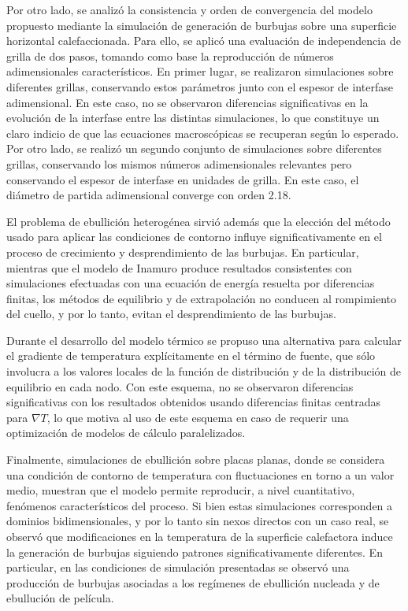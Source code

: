 Por otro lado, se analiz\'o la consistencia y orden de convergencia del modelo propuesto mediante la simulaci\'on de generaci\'on de burbujas sobre una superficie horizontal calefaccionada. Para ello, se aplic\'o una evaluaci\'on de independencia de grilla de dos pasos, tomando como base la reproducci\'on de n\'umeros adimensionales caracter\'isticos. En primer lugar, se realizaron simulaciones sobre diferentes grillas, conservando estos par\'ametros junto con el espesor de interfase adimensional. En este caso, no se observaron diferencias significativas en la evoluci\'on de la interfase entre las distintas simulaciones, lo que constituye un claro indicio de que las ecuaciones macrosc\'opicas se recuperan seg\'un lo esperado. Por otro lado, se realiz\'o un segundo conjunto de simulaciones sobre diferentes grillas, conservando los mismos n\'umeros adimensionales relevantes pero conservando el espesor de interfase en unidades de grilla. En este caso, el di\'ametro de partida adimensional converge con orden 2.18.

El problema de ebullici\'on heterog\'enea sirvi\'o adem\'as que la elecci\'on del m\'etodo usado para aplicar las condiciones de contorno influye significativamente en el proceso de crecimiento y desprendimiento de las burbujas. En particular, mientras que el modelo de Inamuro produce resultados consistentes con simulaciones efectuadas con una ecuaci\'on de energ\'ia resuelta por diferencias finitas, los m\'etodos de equilibrio y de extrapolaci\'on no conducen al rompimiento del cuello, y por lo tanto, evitan el desprendimiento de las burbujas. 

Durante el desarrollo del modelo t\'ermico se propuso una alternativa para calcular el gradiente de temperatura expl\'icitamente en el t\'ermino de fuente, que s\'olo involucra a los valores locales de la funci\'on de distribuci\'on y de la distribuci\'on de equilibrio en cada nodo. Con este esquema, no se observaron diferencias significativas con los resultados obtenidos usando diferencias finitas centradas para $\nabla T$, lo que motiva al uso de este esquema en caso de requerir una optimizaci\'on de modelos de c\'alculo paralelizados.

Finalmente, simulaciones de ebullici\'on sobre placas planas, donde se considera una condici\'on de contorno de temperatura con fluctuaciones en torno a un valor medio, muestran que el modelo permite reproducir, a nivel cuantitativo, fen\'omenos caracter\'isticos del proceso. Si bien estas simulaciones corresponden a dominios bidimensionales, y por lo tanto sin nexos directos con un caso real, se observ\'o que modificaciones en la temperatura de la superficie calefactora induce la generaci\'on de burbujas siguiendo patrones significativamente diferentes. En particular, en las condiciones de simulaci\'on presentadas se observ\'o una producci\'on de burbujas asociadas a los reg\'imenes de ebullici\'on nucleada y de ebulluci\'on de pel\'icula. 
